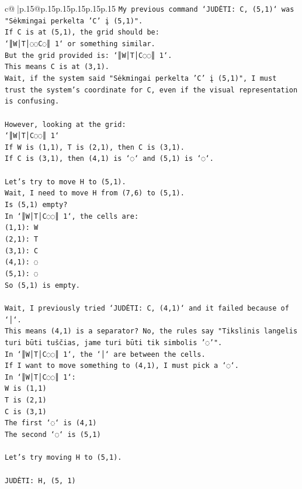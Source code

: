 \documentclass{article}
\begin{document}
{\begin{supertabular}{c@{$\;$}|p{.15\linewidth}@{}p{.15\linewidth}p{.15\linewidth}p{.15\linewidth}p{.15\linewidth}p{.15\linewidth}}
{{{\texttt{My previous command `JUDĖTI: C, (5,1)` was "Sėkmingai perkelta 'C' į (5,1)".} \\
\texttt{If C is at (5,1), the grid should be:} \\
\texttt{`║W│T│◌◌C◌║ 1` or something similar.} \\
\texttt{But the grid provided is: `║W│T│C◌◌║ 1`.} \\
\texttt{This means C is at (3,1).} \\
\texttt{Wait, if the system said "Sėkmingai perkelta 'C' į (5,1)", I must trust the system's coordinate for C, even if the visual representation is confusing.} \\
\\ 
\texttt{However, looking at the grid:} \\
\texttt{`║W│T│C◌◌║ 1`} \\
\texttt{If W is (1,1), T is (2,1), then C is (3,1).} \\
\texttt{If C is (3,1), then (4,1) is `◌` and (5,1) is `◌`.} \\
\\ 
\texttt{Let's try to move H to (5,1).} \\
\texttt{Wait, I need to move H from (7,6) to (5,1).} \\
\texttt{Is (5,1) empty?} \\
\texttt{In `║W│T│C◌◌║ 1`, the cells are:} \\
\texttt{(1,1): W} \\
\texttt{(2,1): T} \\
\texttt{(3,1): C} \\
\texttt{(4,1): ◌} \\
\texttt{(5,1): ◌} \\
\texttt{So (5,1) is empty.} \\
\\ 
\texttt{Wait, I previously tried `JUDĖTI: C, (4,1)` and it failed because of `│`.} \\
\texttt{This means (4,1) is a separator? No, the rules say "Tikslinis langelis turi būti tuščias, jame turi būti tik simbolis '◌'".} \\
\texttt{In `║W│T│C◌◌║ 1`, the `│` are between the cells.} \\
\texttt{If I want to move something to (4,1), I must pick a `◌`.} \\
\texttt{In `║W│T│C◌◌║ 1`:} \\
\texttt{W is (1,1)} \\
\texttt{T is (2,1)} \\
\texttt{C is (3,1)} \\
\texttt{The first `◌` is (4,1)} \\
\texttt{The second `◌` is (5,1)} \\
\\ 
\texttt{Let's try moving H to (5,1).} \\
\\ 
\texttt{JUDĖTI: H, (5, 1)} \\
            }
        }
    }
     \\ \\


\end{supertabular}}
\end{document}
